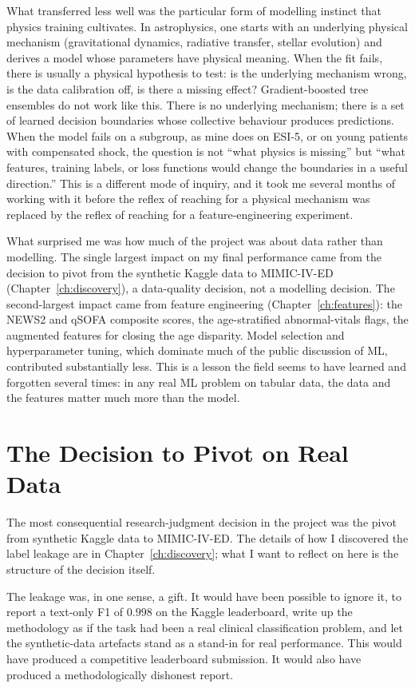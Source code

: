 What transferred less well was the particular form of modelling instinct that physics training cultivates. In astrophysics, one starts with an underlying physical mechanism (gravitational dynamics, radiative transfer, stellar evolution) and derives a model whose parameters have physical meaning. When the fit fails, there is usually a physical hypothesis to test: is the underlying mechanism wrong, is the data calibration off, is there a missing effect? Gradient-boosted tree ensembles do not work like this. There is no underlying mechanism; there is a set of learned decision boundaries whose collective behaviour produces predictions. When the model fails on a subgroup, as mine does on ESI-5, or on young patients with compensated shock, the question is not ``what physics is missing'' but ``what features, training labels, or loss functions would change the boundaries in a useful direction.'' This is a different mode of inquiry, and it took me several months of working with it before the reflex of reaching for a physical mechanism was replaced by the reflex of reaching for a feature-engineering experiment.

What surprised me was how much of the project was about data rather than modelling. The single largest impact on my final performance came from the decision to pivot from the synthetic Kaggle data to MIMIC-IV-ED (Chapter~\ref{ch:discovery}), a data-quality decision, not a modelling decision. The second-largest impact came from feature engineering (Chapter~\ref{ch:features}): the NEWS2 and qSOFA composite scores, the age-stratified abnormal-vitals flags, the augmented features for closing the age disparity. Model selection and hyperparameter tuning, which dominate much of the public discussion of ML, contributed substantially less. This is a lesson the field seems to have learned and forgotten several times: in any real ML problem on tabular data, the data and the features matter much more than the model.

\section{The Decision to Pivot on Real Data}

The most consequential research-judgment decision in the project was the pivot from synthetic Kaggle data to MIMIC-IV-ED. The details of how I discovered the label leakage are in Chapter~\ref{ch:discovery}; what I want to reflect on here is the structure of the decision itself.

The leakage was, in one sense, a gift. It would have been possible to ignore it, to report a text-only F1 of $0.998$ on the Kaggle leaderboard, write up the methodology as if the task had been a real clinical classification problem, and let the synthetic-data artefacts stand as a stand-in for real performance. This would have produced a competitive leaderboard submission. It would also have produced a methodologically dishonest report.

